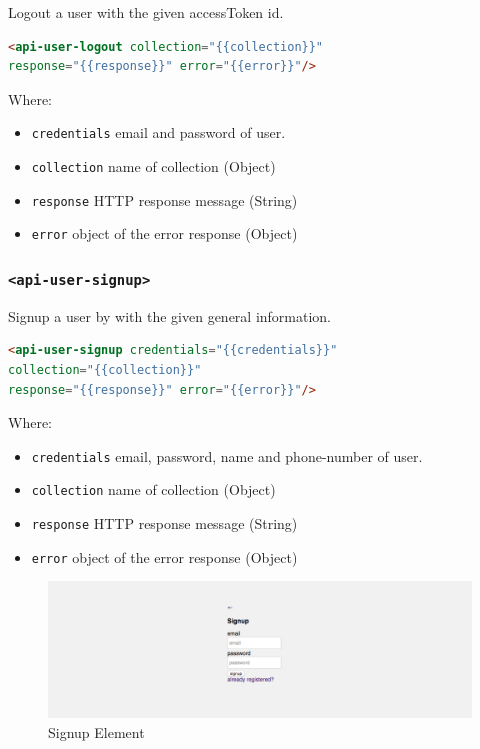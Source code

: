 Logout a user with the given accessToken id.
\begin{lstlisting}[language=html]
<api-user-logout collection="{{collection}}" 
response="{{response}}" error="{{error}}"/>
\end{lstlisting}
Where:
\begin{itemize}
\item \texttt{credentials} email and password of user.
\item \texttt{collection} name of collection (Object)
\item \texttt{response}	HTTP response message (String)
\item \texttt{error} object of the error response (Object)
\end{itemize}

\subsubsection{\texttt{<api-user-signup>}}

Signup a user by with the given general information.
\begin{lstlisting}[language=html]
<api-user-signup credentials="{{credentials}}"
collection="{{collection}}" 
response="{{response}}" error="{{error}}"/>
\end{lstlisting}
Where:
\begin{itemize}
\item \texttt{credentials} email, password, name and phone-number of user.
\item \texttt{collection} name of collection (Object)
\item \texttt{response}	HTTP response message (String)
\item \texttt{error} object of the error response (Object)
\end{itemize}

\begin {figure}[h]
\graphicspath{{images/chapter_USR/}}
\includegraphics[width=\textwidth]{usr4}
\caption{Signup Element}
\end {figure}

